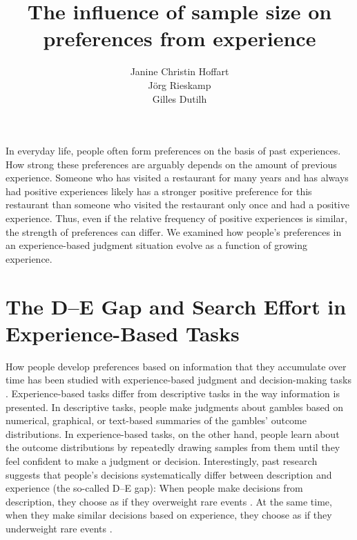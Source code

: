 \documentclass[a4paper,man, natbib]{apa6} %
\title{The influence of sample size on preferences from experience}
\author{Janine Christin Hoffart\\J\"org Rieskamp\\Gilles Dutilh}
\affiliation{University of Basel, Department of Psychology, Center for Economic Psychology}
\begin{document}
\maketitle
In everyday life, people often form preferences on the basis of past experiences. How strong these preferences are arguably depends on the amount of previous experience. Someone who has visited a restaurant for many years and has always had positive experiences likely has a stronger positive preference for this restaurant than someone who visited the restaurant only once and had a positive experience. Thus, even if the relative frequency of positive experiences is similar, the strength of preferences can differ. We examined how people's preferences in an experience-based judgment situation evolve as a function of growing experience. 


\section{The D--E Gap and Search Effort in Experience-Based Tasks}
How people develop preferences based on information that they accumulate over time has been studied with experience-based judgment and decision-making tasks \citep[e.g.,][]{Hertwig2004, Hau2008}. %
Experience-based tasks differ from descriptive tasks in the way information is presented. In descriptive tasks, people make judgments about gambles based on numerical, graphical, or text-based summaries of the gambles' outcome distributions. In experience-based tasks, on the other hand, people learn about the outcome distributions by repeatedly drawing samples from them until they feel confident to make a judgment or decision. Interestingly, past research suggests that people's decisions systematically differ between description and experience (the so-called D--E gap): When people make decisions from description, they choose as if they overweight rare events \citep{Kahneman1979}. At the same time, when they make similar decisions based on experience, they choose as if they underweight rare events \citep{Hertwig2004}. 
\end{document}
